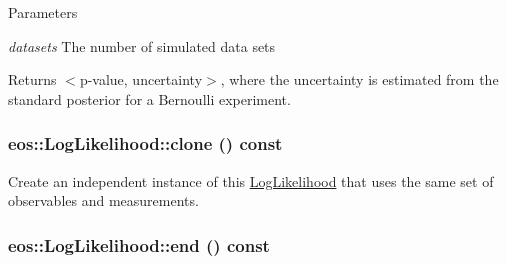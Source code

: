 \begin{DoxyParams}{Parameters}
\item[{\em datasets}]The number of simulated data sets \end{DoxyParams}
\begin{DoxyReturn}{Returns}
$<$p-\/value, uncertainty$>$, where the uncertainty is estimated from the standard posterior for a Bernoulli experiment. 
\end{DoxyReturn}
\hypertarget{classeos_1_1LogLikelihood_a0aed658b79b9915a79ceba3a2fe10509}{
\subsubsection[{clone}]{ eos::LogLikelihood::clone () const}}
\label{classeos_1_1LogLikelihood_a0aed658b79b9915a79ceba3a2fe10509}
Create an independent instance of this \hyperlink{classeos_1_1LogLikelihood}{LogLikelihood} that uses the same set of observables and measurements. \hypertarget{classeos_1_1LogLikelihood_a15bf635f6541e9fb16463c5dbb4b462b}{
\subsubsection[{end}]{ eos::LogLikelihood::end () const}}
\label{classeos_1_1LogLikelihood_a15bf635f6541e9fb16463c5dbb4b462b}


